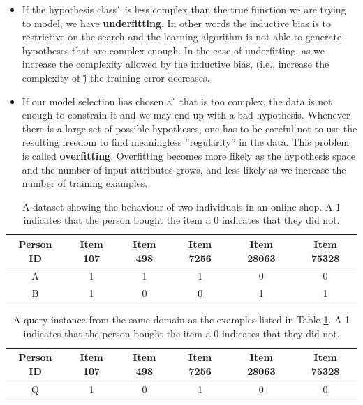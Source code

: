 \documentclass[--SOLUTION-OPTION--]{ditpaper}
\begin{document}
\begin{enumerate}
\begin{answer}
\begin{itemize}
			\item If the hypothesis class \H~is less complex than the true function we are trying to model, we have \textbf{underfitting}. In other words the inductive bias is to restrictive on the search and the learning algorithm is not able to generate hypotheses that are complex enough. In the case of underfitting, as we increase the complexity allowed by the inductive bias, (i.e., increase the complexity of \H) the training error decreases. 
			\item If our model selection has chosen a \H~that is too complex, the data is not enough to constrain it and we may end up with a bad hypothesis. Whenever there is a large set of possible hypotheses, one has to be careful not to use the resulting freedom to find meaningless ''regularity'' in the data. This problem is called \textbf{overfitting}. Overfitting becomes more likely as the hypothesis space and the number of input attributes grows, and less likely as we increase the number of training examples.
		\end{itemize}
\end{answer}



\end{enumerate}


\newpage

		
\begin{table}[!tb]
\caption{A dataset showing the behaviour of two individuals in an online shop. A 1 indicates that the person bought the item a 0 indicates that they did not.}
\label{table:binaryDataset}
\centering
\begin{tabular}{ | c | c | c | c | c | c |}
\hline
Person ID & Item 107 & Item 498 & Item 7256 & Item 28063 & Item 75328\\
\hline
A  &  1 & 1 & 1 & 0 & 0\\
B  &  1 & 0 & 0 & 1 & 1\\
\hline \hline 
\end{tabular}
\label{tab:binarydata}
\end{table}

\begin{table}[!tb]
\caption{A query instance from the same domain as the examples listed in Table \ref{tab:binarydata}. A 1 indicates that the person bought the item a 0 indicates that they did not.}
\label{table:binaryDataset}
\centering
\begin{tabular}{ | c | c | c | c | c | c |}
\hline
Person ID & Item 107 & Item 498 & Item 7256 & Item 28063 & Item 75328\\
\hline
Q  &  1 & 0 & 1 & 0 & 0\\
\hline \hline 
\end{tabular}
\label{tab:binaryquery}
\end{table}
\end{document}
